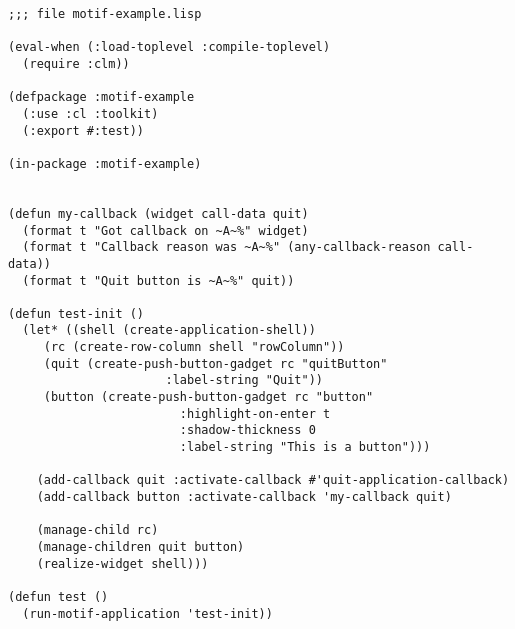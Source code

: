 \documentclass[a4paper]{article}
\begin{document}
\begin{verbatim}
;;; file motif-example.lisp

(eval-when (:load-toplevel :compile-toplevel)
  (require :clm))

(defpackage :motif-example
  (:use :cl :toolkit)
  (:export #:test))

(in-package :motif-example)


(defun my-callback (widget call-data quit)
  (format t "Got callback on ~A~%" widget)
  (format t "Callback reason was ~A~%" (any-callback-reason call-data))
  (format t "Quit button is ~A~%" quit))

(defun test-init ()
  (let* ((shell (create-application-shell))
	 (rc (create-row-column shell "rowColumn"))
	 (quit (create-push-button-gadget rc "quitButton"
					  :label-string "Quit"))
	 (button (create-push-button-gadget rc "button"
					    :highlight-on-enter t
					    :shadow-thickness 0
					    :label-string "This is a button")))

    (add-callback quit :activate-callback #'quit-application-callback)
    (add-callback button :activate-callback 'my-callback quit)

    (manage-child rc)
    (manage-children quit button)
    (realize-widget shell)))

(defun test ()
  (run-motif-application 'test-init))
\end{verbatim}
\end{document}
